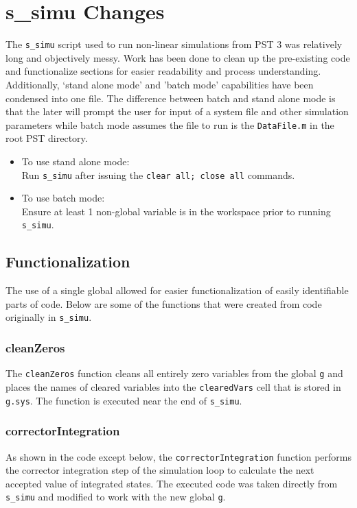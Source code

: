 \pagebreak
\section{s\_simu Changes}
The \verb|s_simu| script used to run non-linear simulations from PST 3 was relatively long and objectively messy.
Work has been done to clean up the pre-existing code and functionalize sections for easier readability and process understanding.
Additionally, `stand alone mode' and 'batch mode' capabilities have been condensed into one file.
The difference between batch and stand alone mode is that the later will prompt the user for input of a system file and other simulation parameters while batch mode assumes the file to run is the \verb|DataFile.m| in the root PST directory.
\begin{itemize}
\item To use stand alone mode:\\
Run \verb|s_simu| after issuing the \verb|clear all; close all| commands.
\item To use batch mode:\\
Ensure at least 1 non-global variable is in the workspace prior to running \verb|s_simu|.
\end{itemize}


\subsection{Functionalization}
The use of a single global allowed for easier functionalization of easily identifiable parts of code.
Below are some of the functions that were created from code originally in \verb|s_simu|.



\subsubsection{cleanZeros}  
The \verb|cleanZeros| function cleans all entirely zero variables from the global \verb|g| and places the names of cleared variables into the \verb|clearedVars| cell that is stored in \verb|g.sys|.
The function is executed near the end of \verb|s_simu|.


\subsubsection{correctorIntegration}  
As shown in the code except below, the \verb|correctorIntegration| function performs the corrector integration step of the simulation loop to calculate the next accepted value of integrated states.
The executed code was taken directly from \verb|s_simu| and modified to work with the new global \verb|g|.

